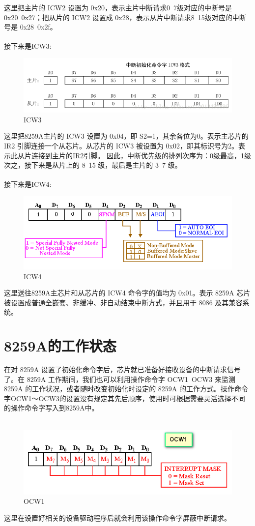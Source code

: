 \documentclass[12pt]{article}
\begin{document}
这里把主片的 ICW2 设置为 0x20，表示主片中断请求0~7级对应的中断号是 0x20~0x27；把从片的 ICW2 设置成 0x28，表示从片中断请求8~15级对应的中断号是 0x28~0x2f。 \\\\
接下来是ICW3:
\begin{figure}[htbp]
\centering
\includegraphics[scale=0.6]{fig/4.png}
\caption{ICW3}
\label{fig:8259 ICW3}
\end{figure}
这里把8259A主片的 ICW3 设置为 0x04，即 S2=1，其余各位为0。表示主芯片的 IR2 引脚连接一个从芯片。从芯片的 ICW3 被设置为 0x02，即其标识号为2。表示此从片连接到主片的IR2引脚。 因此，中断优先级的排列次序为：0级最高，1级次之，接下来是从片上的 8~15 级，最后是主片的 3~7 级。 \\\\
接下来是ICW4:
\begin{figure}[htbp]
\centering
\includegraphics[scale=0.5]{fig/5.png}
\caption{ICW4}
\label{fig:8259 ICW4}
\end{figure}
这里送往8259A主芯片和从芯片的 ICW4 命令字的值均为 0x01。表示 8259A 芯片被设置成普通全嵌套、非缓冲、非自动结束中断方式，并且用于 8086 及其兼容系统。
\section{8259A的工作状态}
在对 8259A 设置了初始化命令字后，芯片就已准备好接收设备的中断请求信号了。在 8259A 工作期间，我们也可以利用操作命令字 OCW1~OCW3 来监测 8259A 的工作状况，或者随时改变初始化时设定的 8259A 的工作方式。操作命令字OCW1～OCW3的设置没有规定其先后顺序，使用时可根据需要灵活选择不同的操作命令字写入到8259A中。\\\\
\begin{figure}[htbp]
\centering
\includegraphics[scale=0.6]{fig/6.png}
\caption{OCW1}
\label{fig:8259 OCW1}
\end{figure}
这里在设置好相关的设备驱动程序后就会利用该操作命令字屏蔽中断请求。
\end{document}
